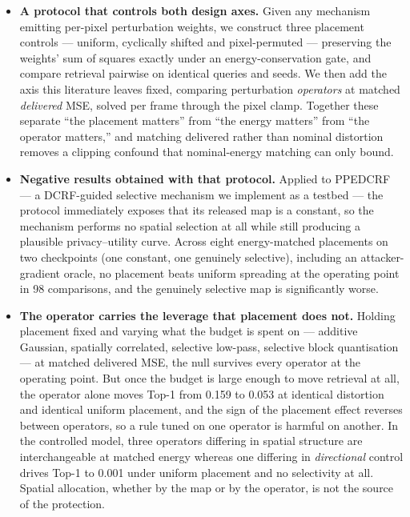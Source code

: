 \documentclass[10pt,journal]{IEEEtran}
\begin{document}
\begin{itemize}
    \item \textbf{A protocol that controls both design axes.} Given any mechanism emitting per-pixel perturbation weights, we construct three placement controls --- uniform, cyclically shifted and pixel-permuted --- preserving the weights' sum of squares exactly under an energy-conservation gate, and compare retrieval pairwise on identical queries and seeds. We then add the axis this literature leaves fixed, comparing perturbation \emph{operators} at matched \emph{delivered} MSE, solved per frame through the pixel clamp. Together these separate ``the placement matters'' from ``the energy matters'' from ``the operator matters,'' and matching delivered rather than nominal distortion removes a clipping confound that nominal-energy matching can only bound.
	\item \textbf{Negative results obtained with that protocol.} Applied to PPEDCRF --- a DCRF-guided selective mechanism we implement as a testbed --- the protocol immediately exposes that its released map is a constant, so the mechanism performs no spatial selection at all while still producing a plausible privacy--utility curve. Across eight energy-matched placements on two checkpoints (one constant, one genuinely selective), including an attacker-gradient oracle, no placement beats uniform spreading at the operating point in 98 comparisons, and the genuinely selective map is significantly worse.
	\item \textbf{The operator carries the leverage that placement does not.} Holding placement fixed and varying what the budget is spent on --- additive Gaussian, spatially correlated, selective low-pass, selective block quantisation --- at matched delivered MSE, the null survives every operator at the operating point. But once the budget is large enough to move retrieval at all, the operator alone moves Top-1 from 0.159 to 0.053 at identical distortion and identical uniform placement, and the sign of the placement effect reverses between operators, so a rule tuned on one operator is harmful on another. In the controlled model, three operators differing in spatial structure are interchangeable at matched energy whereas one differing in \emph{directional} control drives Top-1 to 0.001 under uniform placement and no selectivity at all. Spatial allocation, whether by the map or by the operator, is not the source of the protection.

\end{itemize}
\end{document}
